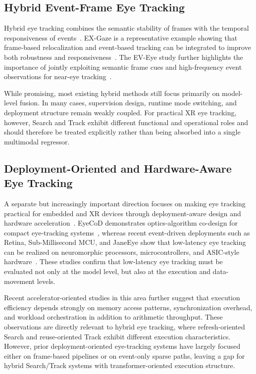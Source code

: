 ﻿\documentclass[journal]{IEEEtran}
\begin{document}
\subsection{Hybrid Event-Frame Eye Tracking}

Hybrid eye tracking combines the semantic stability of frames with the temporal responsiveness of events~\cite{chen2025ex,zhao2023ev}. EX-Gaze is a representative example showing that frame-based relocalization and event-based tracking can be integrated to improve both robustness and responsiveness~\cite{chen2025ex}. The EV-Eye study further highlights the importance of jointly exploiting semantic frame cues and high-frequency event observations for near-eye tracking~\cite{zhao2023ev}.

While promising, most existing hybrid methods still focus primarily on model-level fusion. In many cases, supervision design, runtime mode switching, and deployment structure remain weakly coupled. For practical XR eye tracking, however, Search and Track exhibit different functional and operational roles and should therefore be treated explicitly rather than being absorbed into a single multimodal regressor.

\subsection{Deployment-Oriented and Hardware-Aware Eye Tracking}

A separate but increasingly important direction focuses on making eye tracking practical for embedded and XR devices through deployment-aware design and hardware acceleration~\cite{you2022eyecod,han2026janeeye,giordano2025sub,bonazzi2024retina}. EyeCoD demonstrates optics-algorithm co-design for compact eye-tracking systems~\cite{you2022eyecod}, whereas recent event-driven deployments such as Retina, Sub-Millisecond MCU, and JaneEye show that low-latency eye tracking can be realized on neuromorphic processors, microcontrollers, and ASIC-style hardware~\cite{bonazzi2024retina,giordano2025sub,han2026janeeye}. These studies confirm that low-latency eye tracking must be evaluated not only at the model level, but also at the execution and data-movement levels.

Recent accelerator-oriented studies in this area further suggest that execution efficiency depends strongly on memory access patterns, synchronization overhead, and workload orchestration in addition to arithmetic throughput. These observations are directly relevant to hybrid eye tracking, where refresh-oriented Search and reuse-oriented Track exhibit different execution characteristics. However, prior deployment-oriented eye-tracking systems have largely focused either on frame-based pipelines or on event-only sparse paths, leaving a gap for hybrid Search/Track systems with transformer-oriented execution structure.
\end{document}
